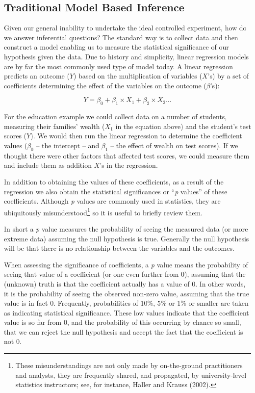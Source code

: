 \documentclass[]{memoir}
\begin{document}
\subsection{Traditional Model Based Inference}

Given our general inability to undertake the ideal controlled
experiment, how do we answer inferential questions? The standard way is
to collect data and then construct a model enabling us to measure the
statistical significance of our hypothesis given the data. Due to
history and simplicity, linear regression models are by far the most
commonly used type of model today. A linear regression predicts an
outcome ($Y$) based on the multiplication of variables ($X$'s) by a set
of coefficients determining the effect of the variables on the outcome
($\beta$'s):

\[ Y = \beta_0 + \beta_1 \times X_1 + \beta_2 \times X_2 ... \]

For the education example we could collect data on a number of students,
measuring their families' wealth ($X_1$ in the equation above) and the
student's test scores ($Y$). We would then run the linear regression to
determine the coefficient values ($\beta_0$ -- the intercept -- and
$\beta_1$ -- the effect of wealth on test scores). If we thought there
were other factors that affected test scores, we could measure them and
include them as addition $X$'s in the regression.

In addition to obtaining the values of these coefficients, as a result
of the regression we also obtain the statistical significances or
``\emph{p} values'' of these coefficients. Although \emph{p} values are
commonly used in statistics, they are ubiquitously
misunderstood\footnote{These misunderstandings are not only made by
  on-the-ground practitioners and analysts, they are frequently shared,
  and propagated, by university-level statistics instructors; see, for
  instance, Haller and Krauss (2002).} so it is useful to briefly review
them.

In short a \emph{p} value measures the probability of seeing the
measured data (or more extreme data) assuming the null hypothesis is
true. Generally the null hypothesis will be that there is no
relationship between the variables and the outcomes.

When assessing the significance of coefficients, a \emph{p} value means
the probability of seeing that value of a coefficient (or one even
further from 0), assuming that the (unknown) truth is that the
coefficient actually has a value of 0. In other words, it is the
probability of seeing the observed non-zero value, assuming that the
true value is in fact 0. Frequently, probabilities of 10\%, 5\% or 1\%
or smaller are taken as indicating statistical significance. These low
values indicate that the coefficient value is so far from 0, and the
probability of this occurring by chance so small, that we can reject the
null hypothesis and accept the fact that the coefficient is not 0.
\end{document}
